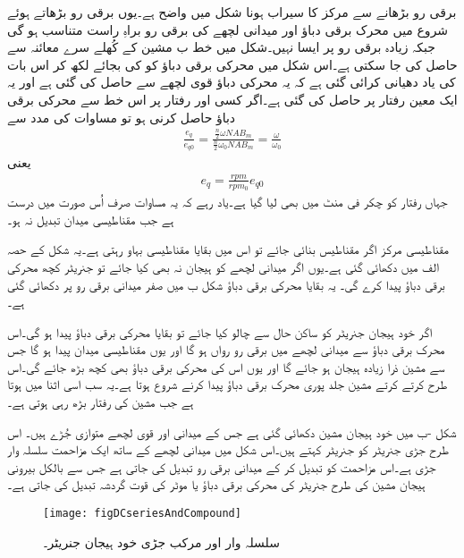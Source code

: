 برقی رو بڑھانے سے مرکز کا سیراب ہونا شکل   میں واضح ہے۔یوں برقی رو بڑھاتے ہوئے شروع میں محرک برقی دباؤ اور میدانی لچھے کی برقی رو براہِ راست متناسب ہو گی جبکہ زیادہ برقی رو پر ایسا نہیں۔شکل میں خط ب مشین کے کُھلے سرے معائنہ سے حاصل کی جا سکتی ہے۔اس شکل میں محرکی برقی دباؤ کو  کی بجائے   لکھ کر اس بات کی یاد دھیانی کرائی گئی ہے کہ یہ محرکی دباؤ  قوی لچھے سے حاصل کی گئی ہے اور یہ ایک معین رفتار  پر حاصل کی گئی ہے۔اگر کسی اور رفتار  پر اس خط سے محرکی برقی دباؤ  حاصل کرنی ہو تو مساوات   کی مدد سے
\begin{align}
\frac{e_q}{e_{q0}}=\frac{\frac{n}{2} \omega N A B_m}{\frac{n}{2} \omega_0 N A B_m}=\frac{\omega}{\omega_0}
\end{align}
یعنی
\begin{align}\label{مساوات_یکسمتی_چکر_بالمقابل_رفتار}
e_q=\frac{rpm}{rpm_0} e_{q0}
\end{align}
جہاں رفتار کو چکر فی منٹ میں بھی لیا گیا ہے۔یاد رہے کہ یہ مساوات صرف اُس صورت میں درست ہے جب مقناطیسی میدان تبدیل نہ ہو۔

مقناطیسی مرکز اگر مقناطیس بنائی جائے تو اس میں بقایا مقناطیسی بہاو رہتی ہے۔یہ شکل کے حصہ الف میں دکھائی گئی ہے۔یوں اگر میدانی لچھے کو ہیجان نہ بھی کیا جائے تو جنریٹر کچھ محرکی برقی دباؤ پیدا کرے گی۔ یہ بقایا  محرکی برقی دباؤ شکل ب میں صفر میدانی برقی رو پر دکھائی گئی ہے۔

 اگر خود ہیجان جنریٹر کو ساکن حال سے چالو کیا جائے تو بقایا محرکی برقی دباؤ پیدا ہو گی۔اس محرک برقی دباؤ سے میدانی لچھے میں برقی رو رواں ہو گا اور یوں مقناطیسی میدان پیدا ہو گا جس سے مشین ذرا زیادہ ہیجان ہو جائے گا اور یوں اس کی محرکی برقی دباؤ بھی کچھ بڑھ جائے گی۔اس طرح کرتے کرتے مشین جلد پوری محرک برقی دباؤ پیدا کرنے شروع ہوتا ہے۔یہ سب اسی اثنا میں ہوتا ہے جب مشین کی رفتار بڑھ رہی ہوتی ہے۔

شکل -ب میں خود ہیجان مشین دکھائی گئی ہے جس کے میدانی اور قوی لچھے متوازی جُڑے ہیں۔ اس طرح جڑی جنریٹر کو  جنریٹر کہتے ہیں۔اس شکل میں میدانی لچھے کے ساتھ ایک مزاحمت سلسلہ وار جڑی ہے۔اس مزاحمت کو تبدیل کر کے میدانی برقی رو تبدیل کی جاتی ہے جس سے بالکل بیرونی ہیجان مشین کی طرح جنریٹر کی محرکی برقی دباؤ یا موٹر کی قوت گردشہ تبدیل کی جاتی ہے۔
\begin{figure}
\centering
\texttt{[image: figDCseriesAndCompound]}
\caption{سلسلہ وار اور مرکب جڑی خود ہیجان جنریٹر۔}
\label{شکل_یکسمتی_سلسلہ_وار_اور_مرکب}
\end{figure}


